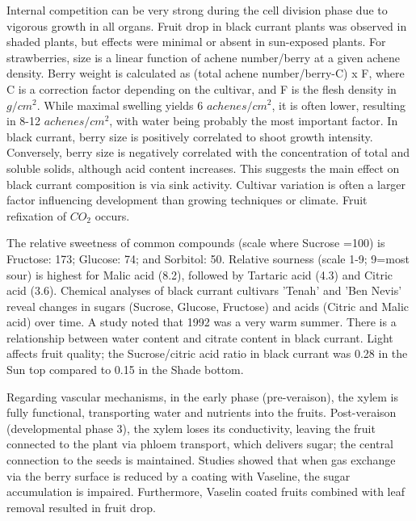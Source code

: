 \vspace{0.5em}
Internal competition can be very strong during the cell division phase due to vigorous growth in all organs. Fruit drop in black currant plants was observed in shaded plants, but effects were minimal or absent in sun-exposed plants. For strawberries, size is a linear function of achene number/berry at a given achene density. Berry weight is calculated as (total achene number/berry-C) x F, where C is a correction factor depending on the cultivar, and F is the flesh density in $g/cm^2$. While maximal swelling yields 6 $achenes/cm^2$, it is often lower, resulting in 8-12 $achenes/cm^2$, with water being probably the most important factor. In black currant, berry size is positively correlated to shoot growth intensity. Conversely, berry size is negatively correlated with the concentration of total and soluble solids, although acid content increases. This suggests the main effect on black currant composition is via sink activity. Cultivar variation is often a larger factor influencing development than growing techniques or climate. Fruit refixation of $CO_2$ occurs.

\vspace{0.5em}
The relative sweetness of common compounds (scale where Sucrose =100) is Fructose: 173; Glucose: 74; and Sorbitol: 50. Relative sourness (scale 1-9; 9=most sour) is highest for Malic acid (8.2), followed by Tartaric acid (4.3) and Citric acid (3.6). Chemical analyses of black currant cultivars 'Tenah' and 'Ben Nevis' reveal changes in sugars (Sucrose, Glucose, Fructose) and acids (Citric and Malic acid) over time. A study noted that 1992 was a very warm summer. There is a relationship between water content and citrate content in black currant. Light affects fruit quality; the Sucrose/citric acid ratio in black currant was 0.28 in the Sun top compared to 0.15 in the Shade bottom.

\vspace{0.5em}
Regarding vascular mechanisms, in the early phase (pre-veraison), the xylem is fully functional, transporting water and nutrients into the fruits. Post-veraison (developmental phase 3), the xylem loses its conductivity, leaving the fruit connected to the plant via phloem transport, which delivers sugar; the central connection to the seeds is maintained. Studies showed that when gas exchange via the berry surface is reduced by a coating with Vaseline, the sugar accumulation is impaired. Furthermore, Vaselin coated fruits combined with leaf removal resulted in fruit drop.

